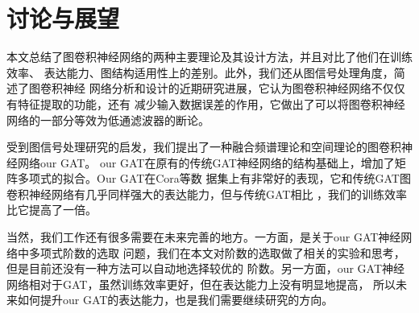 \cleardoublepage

\section{讨论与展望}

本文总结了图卷积神经网络的两种主要理论及其设计方法，并且对比了他们在训练效率、
表达能力、图结构适用性上的差别。此外，我们还从图信号处理角度，简述了图卷积神经
网络分析和设计的近期研究进展，它认为图卷积神经网络不仅仅有特征提取的功能，还有
减少输入数据误差的作用，它做出了可以将图卷积神经网络的一部分等效为低通滤波器的断论。

受到图信号处理研究的启发，我们提出了一种融合频谱理论和空间理论的图卷积神经网络our GAT。
our GAT在原有的传统GAT神经网络的结构基础上，增加了矩阵多项式的拟合。Our GAT在Cora等数
据集上有非常好的表现，它和传统GAT图卷积神经网络有几乎同样强大的表达能力，但与传统GAT相比
，我们的训练效率比它提高了一倍。

当然，我们工作还有很多需要在未来完善的地方。一方面，是关于our GAT神经网络中多项式阶数的选取
问题，我们在本文对阶数的选取做了相关的实验和思考，但是目前还没有一种方法可以自动地选择较优的
阶数。另一方面，our GAT神经网络相对于GAT，虽然训练效率更好，但在表达能力上没有明显地提高，
所以未来如何提升our GAT的表达能力，也是我们需要继续研究的方向。